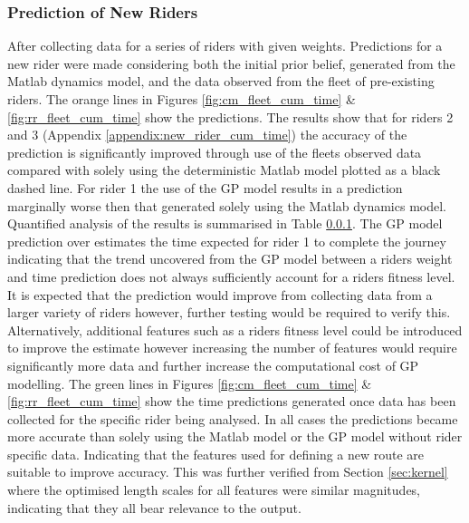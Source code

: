 \documentclass[a4paper, 10pt]{article}
\numberwithin{equation}{section}
\begin{document}
\subsubsection{Prediction of New Riders}

After collecting data for a series of riders with given weights. Predictions for a new rider were made considering both the initial prior belief, generated from the Matlab dynamics model, and the data observed from the fleet of pre-existing riders. The orange lines in Figures \ref{fig:cm_fleet_cum_time} \& \ref{fig:rr_fleet_cum_time} show the predictions. The results show that for riders 2 and 3 (Appendix \ref{appendix:new_rider_cum_time}) the accuracy of the prediction is significantly improved through use of the fleets observed data compared with solely using the deterministic Matlab model plotted as a black dashed line. For rider 1 the use of the GP model results in a prediction marginally worse then that generated solely using the Matlab dynamics model. Quantified analysis of the results is summarised in Table \ref{}. The GP model prediction over estimates the time expected for rider 1 to complete the journey indicating that the trend uncovered from the GP model between a riders weight and time prediction does not always sufficiently account for a riders fitness level. It is expected that the prediction would improve from collecting data from a larger variety of riders however, further testing would be required to verify this. Alternatively, additional features such as a riders fitness level could be introduced to improve the estimate however increasing the number of features would require significantly more data and further increase the computational cost of GP modelling. The green lines in Figures \ref{fig:cm_fleet_cum_time} \& \ref{fig:rr_fleet_cum_time} show the time predictions generated once data has been collected for the specific rider being analysed. In all cases the predictions became more accurate than solely using the Matlab model or the GP model without rider specific data. Indicating that the features used for defining a new route are suitable to improve accuracy. This was further verified from Section \ref{sec:kernel} where the optimised length scales for all features were similar magnitudes, indicating that they all bear relevance to the output.   
\end{document}
